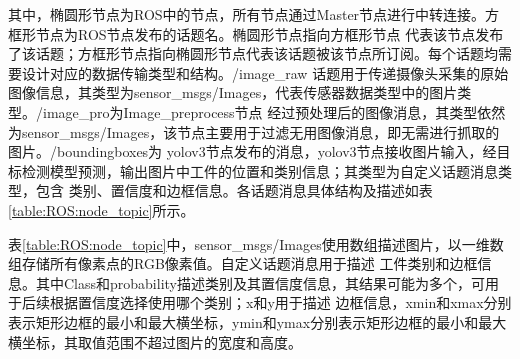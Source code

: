 其中，椭圆形节点为ROS中的节点，所有节点通过Master节点进行中转连接。方框形节点为ROS节点发布的话题名。椭圆形节点指向方框形节点
代表该节点发布了该话题；方框形节点指向椭圆形节点代表该话题被该节点所订阅。每个话题均需要设计对应的数据传输类型和结构。/image\_raw
话题用于传递摄像头采集的原始图像信息，其类型为sensor\_msgs/Images，代表传感器数据类型中的图片类型。/image\_pro为Image\_preprocess节点
经过预处理后的图像消息，其类型依然为sensor\_msgs/Images，该节点主要用于过滤无用图像消息，即无需进行抓取的图片。/boundingboxes为
yolov3节点发布的消息，yolov3节点接收图片输入，经目标检测模型预测，输出图片中工件的位置和类别信息；其类型为自定义话题消息类型，包含
类别、置信度和边框信息。各话题消息具体结构及描述如表\ref{table:ROS:node_topic}所示。

表\ref{table:ROS:node_topic}中，sensor\_msgs/Images使用数组描述图片，以一维数组存储所有像素点的RGB像素值。自定义话题消息用于描述
工件类别和边框信息。其中Class和probability描述类别及其置信度信息，其结果可能为多个，可用于后续根据置信度选择使用哪个类别；x和y用于描述
边框信息，xmin和xmax分别表示矩形边框的最小和最大横坐标，ymin和ymax分别表示矩形边框的最小和最大横坐标，其取值范围不超过图片的宽度和高度。


